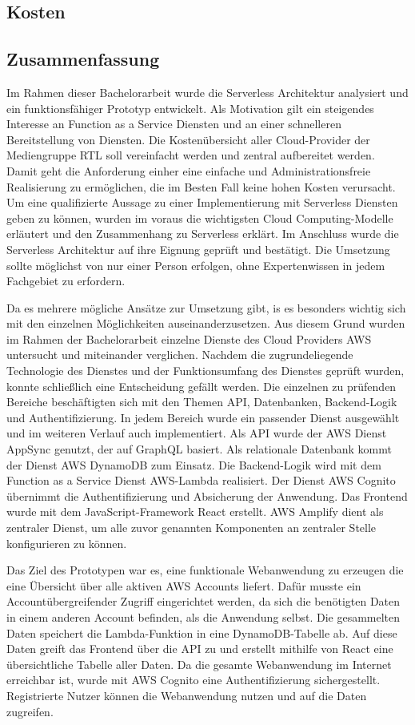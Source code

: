 \subsection{Kosten}
\clearpage

\subsection{Zusammenfassung}
Im Rahmen dieser Bachelorarbeit wurde die Serverless Architektur analysiert und ein funktionsfähiger Prototyp entwickelt.
Als Motivation gilt ein steigendes Interesse an Function as a Service Diensten und an einer schnelleren Bereitstellung von Diensten.
Die Kostenübersicht aller Cloud-Provider der Mediengruppe RTL soll vereinfacht werden und zentral aufbereitet werden.
Damit geht die Anforderung einher eine einfache und Administrationsfreie Realisierung zu ermöglichen, die im Besten Fall keine hohen Kosten verursacht.
Um eine qualifizierte Aussage zu einer Implementierung mit Serverless Diensten geben zu können, wurden im voraus die wichtigsten Cloud Computing-Modelle erläutert und den Zusammenhang zu Serverless erklärt.
Im Anschluss wurde die Serverless Architektur auf ihre Eignung geprüft und bestätigt.
Die Umsetzung sollte möglichst von nur einer Person erfolgen, ohne Expertenwissen in jedem Fachgebiet zu erfordern.

Da es mehrere mögliche Ansätze zur Umsetzung gibt, is es besonders wichtig sich mit den einzelnen Möglichkeiten auseinanderzusetzen.
Aus diesem Grund wurden im Rahmen der Bachelorarbeit einzelne Dienste des Cloud Providers AWS untersucht und miteinander verglichen.
Nachdem die zugrundeliegende Technologie des Dienstes und der Funktionsumfang des Dienstes geprüft wurden, konnte schließlich eine Entscheidung gefällt werden.
Die einzelnen zu prüfenden Bereiche beschäftigten sich mit den Themen API, Datenbanken, Backend-Logik und Authentifizierung.
In jedem Bereich wurde ein passender Dienst ausgewählt und im weiteren Verlauf auch implementiert.
Als API wurde der AWS Dienst AppSync genutzt, der auf GraphQL basiert.
Als relationale Datenbank kommt der Dienst AWS DynamoDB zum Einsatz.
Die Backend-Logik wird mit dem Function as a Service Dienst AWS-Lambda realisiert.
Der Dienst AWS Cognito übernimmt die Authentifizierung und Absicherung der Anwendung.
Das Frontend wurde mit dem JavaScript-Framework React erstellt.
AWS Amplify dient als zentraler Dienst, um alle zuvor genannten Komponenten an zentraler Stelle konfigurieren zu können.

Das Ziel des Prototypen war es, eine funktionale Webanwendung zu erzeugen die eine Übersicht über alle aktiven AWS Accounts liefert.
Dafür musste ein Accountübergreifender Zugriff eingerichtet werden, da sich die benötigten Daten in einem anderen Account befinden, als die Anwendung selbst.
Die gesammelten Daten speichert die Lambda-Funktion in eine DynamoDB-Tabelle ab.
Auf diese Daten greift das Frontend über die API zu und erstellt mithilfe von React eine übersichtliche Tabelle aller Daten.
Da die gesamte Webanwendung im Internet erreichbar ist, wurde mit AWS Cognito eine Authentifizierung sichergestellt.
Registrierte Nutzer können die Webanwendung nutzen und auf die Daten zugreifen.

